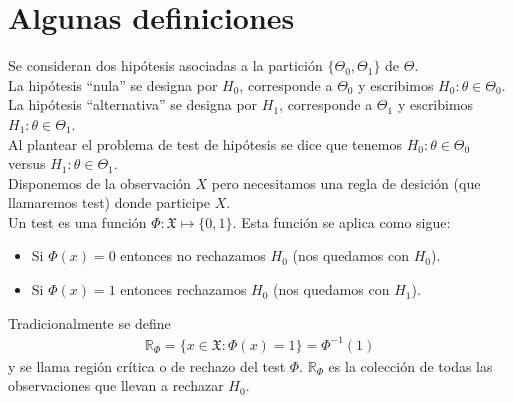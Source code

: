 \documentclass[10pt]{article}
\theoremstyle{plain}
\theoremstyle{definition}
\begin{document}
 \section{Algunas definiciones}
 Se consideran dos hipótesis asociadas a la partición $\{\Theta_{0},\Theta_{1}\}$ de $\Theta$.\\
 La hipótesis ``nula'' se designa por $H_{0}$, corresponde a $\Theta_{0}$ y escribimos $H_{0}\colon \theta \in \Theta_{0}$.\\
 La hipótesis ``alternativa'' se designa por $H_{1}$, corresponde a $\Theta_{1}$ y escribimos $H_{1}\colon \theta \in \Theta_{1}$.\\
 
 Al plantear el problema de test de hipótesis se dice que tenemos $H_{0}\colon \theta \in \Theta_{0}$ versus $H_{1}\colon \theta \in \Theta_{1}$.\\
 
 Disponemos de la observación $X$ pero necesitamos una regla de desición (que llamaremos test) donde participe $X$.\\
 
 Un test es una función $\Phi: \mathfrak{X}\mapsto\{0,1\}$. Esta función se aplica como sigue:
 \begin{itemize}
 \item Si $\Phi(x)=0$ entonces no rechazamos $H_{0}$ (nos quedamos con $H_{0}$).
 \item Si $\Phi(x)=1$ entonces rechazamos $H_{0}$ (nos quedamos con $H_{1}$).
 \end{itemize}
 Tradicionalmente se define
 \begin{align*}
 \mathbb{R}_{\Phi}= \{x\in \mathfrak{X}\colon \Phi(x)=1\} = \Phi^{-1}(1)
 \end{align*}
 y se llama región crítica o de rechazo del test $\Phi$. $\mathbb{R}_{\Phi}$ es la colección de todas las observaciones que llevan a rechazar $H_{0}$.
\end{document}
